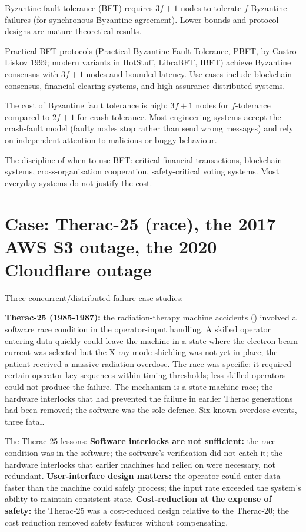 Byzantine fault tolerance (BFT) requires $3f + 1$ nodes to tolerate $f$ Byzantine failures (for synchronous Byzantine agreement). Lower bounds and protocol designs are mature theoretical results.

Practical BFT protocols (Practical Byzantine Fault Tolerance, PBFT, by Castro-Liskov 1999; modern variants in HotStuff, LibraBFT, IBFT) achieve Byzantine consensus with $3f + 1$ nodes and bounded latency. Use cases include blockchain consensus, financial-clearing systems, and high-assurance distributed systems.

The cost of Byzantine fault tolerance is high: $3f + 1$ nodes for $f$-tolerance compared to $2f + 1$ for crash tolerance. Most engineering systems accept the crash-fault model (faulty nodes stop rather than send wrong messages) and rely on independent attention to malicious or buggy behaviour.

The discipline of when to use BFT: critical financial transactions, blockchain systems, cross-organisation cooperation, safety-critical voting systems. Most everyday systems do not justify the cost.

\section{Case: Therac-25 (race), the 2017 AWS S3 outage, the 2020 Cloudflare outage}

Three concurrent/distributed failure case studies:

\textbf{Therac-25 (1985-1987):} the radiation-therapy machine accidents (\cite{paper:leveson-turner1993}) involved a software race condition in the operator-input handling. A skilled operator entering data quickly could leave the machine in a state where the electron-beam current was selected but the X-ray-mode shielding was not yet in place; the patient received a massive radiation overdose. The race was specific: it required certain operator-key sequences within timing thresholds; less-skilled operators could not produce the failure. The mechanism is a state-machine race; the hardware interlocks that had prevented the failure in earlier Therac generations had been removed; the software was the sole defence. Six known overdose events, three fatal.

The Therac-25 lessons:
\textbf{Software interlocks are not sufficient:} the race condition was in the software; the software's verification did not catch it; the hardware interlocks that earlier machines had relied on were necessary, not redundant.
\textbf{User-interface design matters:} the operator could enter data faster than the machine could safely process; the input rate exceeded the system's ability to maintain consistent state.
\textbf{Cost-reduction at the expense of safety:} the Therac-25 was a cost-reduced design relative to the Therac-20; the cost reduction removed safety features without compensating.

